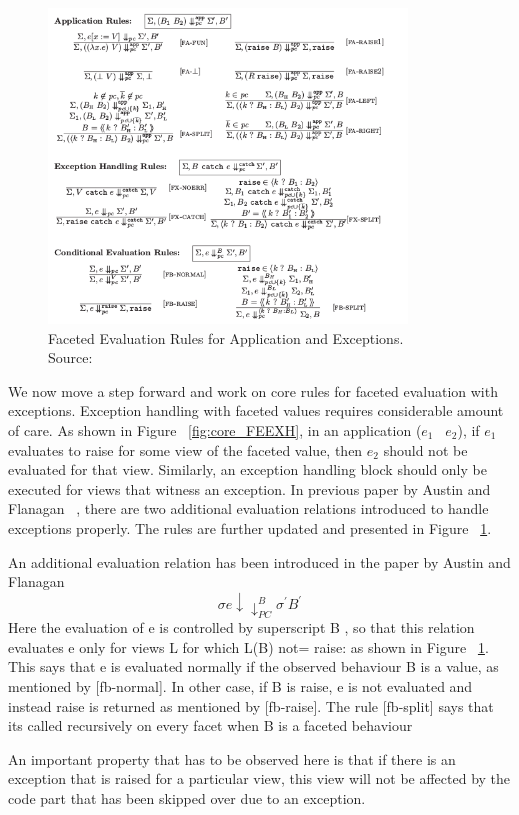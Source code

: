 \begin{figure}
\centering
\includegraphics[width=0.85\textwidth]{images/fig5.png}
\caption[Faceted Evaluation Rules for Application and Exceptions.]
{Faceted Evaluation Rules for Application and Exceptions. \\Source: ~\cite{bib4} } 
\label{fig:FE_AEX}
\end{figure}
We now move a step forward and work on core rules for faceted evaluation with exceptions. Exception handling with faceted values requires considerable amount of care. As shown in Figure ~\ref{fig:core_FEEXH}, in an application ($e_{1}$ \ $e_{2}$), if $e_{1}$ evaluates to raise for some view of the faceted value, then $e_{2}$ should not be evaluated for that view. Similarly, an exception handling block should only be executed for views that witness an exception. In previous paper by Austin and Flanagan ~\cite{bib4}, there are two additional evaluation relations introduced to handle exceptions properly. The rules are further updated and presented in  Figure ~\ref{fig:FE_AEX}.

An additional evaluation relation has been introduced in the paper by Austin and Flanagan ~\cite{bib4}
$$
\sigma e  \downarrow \downarrow^{B}_{PC} \sigma^{'} B^{'}
$$
Here the evaluation of e is controlled by superscript B , so that this relation evaluates e only for views L for which L(B) not= raise: as shown in Figure ~\ref{fig:FE_AEX}. This says that e is evaluated normally if the observed behaviour B is a value, as mentioned by [fb-normal]. In other case, if B is raise, e is not evaluated and instead raise is returned as mentioned by [fb-raise]. The rule [fb-split] says that its called recursively on every facet when B is a faceted behaviour

An important property that has to be observed here is that if there is an exception that is raised for a particular view, this view will not be affected by the code part that has been skipped over due to an exception.